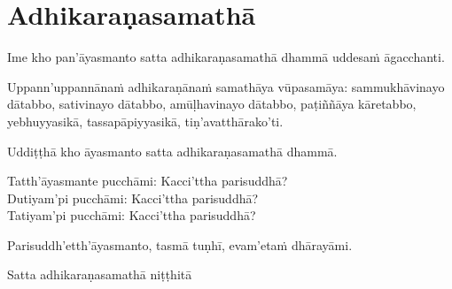 \section{Adhikaraṇasamathā}
\label{adhi}

\begin{intro}
  Ime kho pan'āyasmanto satta adhikaraṇasamathā dhammā uddesaṁ āgacchanti.
\end{intro}

Uppann'uppannānaṁ adhikaraṇānaṁ samathāya vūpasamāya: sammukhāvinayo dātabbo, sativinayo dātabbo, amūḷhavinayo dātabbo, paṭiññāya kāretabbo, yebhuyyasikā, tassapāpiyyasikā, tiṇ'avatthārako'ti.

\medskip

\begin{center}
  Uddiṭṭhā kho āyasmanto satta adhikaraṇasamathā dhammā.

  \smallskip

  Tatth'āyasmante pucchāmi: Kacci'ttha parisuddhā?\\
  Dutiyam'pi pucchāmi: Kacci'ttha parisuddhā?\\
  Tatiyam'pi pucchāmi: Kacci'ttha parisuddhā?

  \smallskip

  Parisuddh'etth'āyasmanto, tasmā tuṇhī, evam'etaṁ dhārayāmi.
\end{center}

\begin{outro}
  Satta adhikaraṇasamathā niṭṭhitā
\end{outro}

\clearpage
